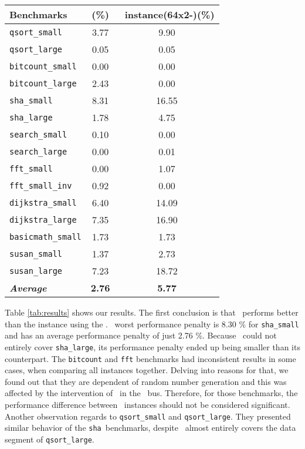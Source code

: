 \begin{table*}[t]
	\center
	\caption{Performance overhead in \% of the evaluated \cshia~instances in comparison of running times in \baseline.}
	\label{tab:results}
	\footnotesize
	\begin{tabular}{|l|c|c|}
		\hline

	    Benchmarks				& \timestamp (\%)	& \cshiamt~instance(64x2-\lru)(\%)\\

		\hline
		\hline
		\texttt{qsort\_small}				& 	3.77	&	9.90\\
		\texttt{qsort\_large}				& 	0.05	&	0.05\\
		\texttt{bitcount\_small}			& 	0.00	&	0.00\\
		\texttt{bitcount\_large}			& 	2.43	&	0.00\\
		\texttt{sha\_small}					& 	8.31	&	16.55\\
		\texttt{sha\_large}					& 	1.78	&	4.75\\
		\texttt{search\_small}				& 	0.10	&	0.00\\
		\texttt{search\_large}				& 	0.00	&	0.01\\
		\texttt{fft\_small}					& 	0.00	&	1.07\\
		\texttt{fft\_small\_inv}			& 	0.92	&	0.00\\
		\texttt{dijkstra\_small}			& 	6.40	&	14.09\\
		\texttt{dijkstra\_large}			& 	7.35	&	16.90\\
		\texttt{basicmath\_small}			& 	1.73	&	1.73\\
		\texttt{susan\_small}				& 	1.37	&	2.73\\
		\texttt{susan\_large}				& 	7.23	&	18.72\\
		\hline
		\textit{\textbf{Average}}			&	\textbf{2.76}	&	\textbf{5.77}\\

		\hline
	\end{tabular}
\end{table*}

Table \ref{tab:results} shows our results. The first conclusion is that \timestamp~performs better than the instance using the \mt. \timestamp~worst performance penalty is 8.30 \% for \texttt{sha\_small} and has an average performance penalty of just 2.76 \%. Because \cshia~could not entirely cover \texttt{sha\_large}, its performance penalty ended up being smaller than its counterpart. The \texttt{bitcount} and \texttt{fft} benchmarks had inconsistent results in some cases, when comparing all instances together. Delving into reasons for that, we found out that they are dependent of random number generation and this was affected by the intervention of \cshia~in the \amba~bus. Therefore, for those benchmarks, the performance difference between \cshia~instances should not be considered significant. Another observation regards to \texttt{qsort\_small} and \texttt{qsort\_large}. They presented similar behavior of the \texttt{sha}~benchmarks, despite \cshia~almost entirely covers the data segment of \texttt{qsort\_large}. 

